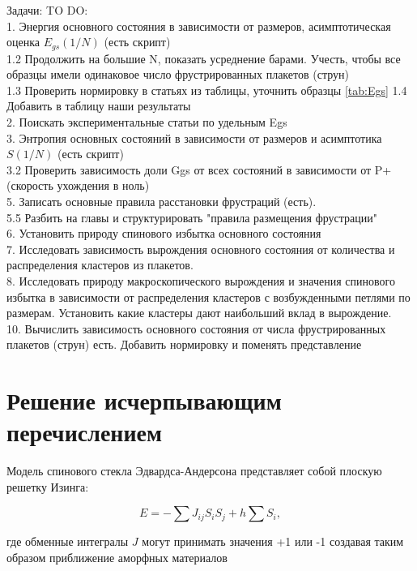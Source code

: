 \documentclass[utf8, babel, sor, jor, amsmath, amssymb, reprint]{elsarticle} %
\begin{document}
Задачи:
TO DO: \\
1. Энергия основного состояния в зависимости от размеров, асимптотическая оценка $E_{gs}(1/N)$ (есть скрипт)\\
1.2 Продолжить на большие N, показать усреднение барами. Учесть, чтобы все образцы имели одинаковое число фрустрированных плакетов (струн) \\
1.3 Проверить нормировку в статьях из таблицы, уточнить образцы \ref{tab:Egs}
1.4 Добавить в таблицу наши результаты\\
2. Поискать экспериментальные статьи по удельным Egs\\
3. Энтропия основных состояний в зависимости от размеров и асимптотика $S(1/N)$  (есть скрипт)\\
3.2 Проверить зависимость доли Ggs от всех состояний в зависимости от P+ (скорость ухождения в ноль)\\
5. Записать основные правила расстановки фрустраций (есть).\\
5.5 Разбить на главы и структурировать "правила размещения фрустрации"\\
6. Установить природу спинового избытка основного состояния \\
7. Исследовать зависимость вырождения основного состояния от количества и распределения кластеров из плакетов.\\
8. Исследовать природу макроскопического вырождения и значения спинового избытка в зависимости от распределения кластеров с возбужденными петлями по размерам. Установить какие кластеры дают наибольший вклад в вырождение. \\
10. Вычислить зависимость основного состояния от числа фрустрированных плакетов (струн) есть. Добавить нормировку и поменять представление\\



\section{Решение исчерпывающим перечислением}

Модель спинового стекла Эдвардса-Андерсона представляет собой плоскую решетку Изинга:

\begin{equation}
	E = -\sum J_{ij} S_i S_j + h \sum S_i,
	\label{eq:ising_energy}
\end{equation}

 где обменные интегралы $J$ могут принимать значения +1 или -1 создавая таким образом приближение аморфных материалов
\end{document}
